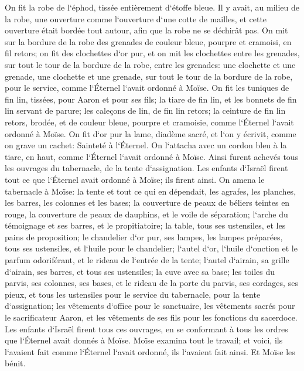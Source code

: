 \verse On fit la robe de l`éphod, tissée entièrement d`étoffe bleue. 
\verse Il y avait, au milieu de la robe, une ouverture comme l`ouverture d`une cotte de mailles, et cette ouverture était bordée tout autour, afin que la robe ne se déchirât pas. 
\verse On mit sur la bordure de la robe des grenades de couleur bleue, pourpre et cramoisi, en fil retors; 
\verse on fit des clochettes d`or pur, et on mit les clochettes entre les grenades, sur tout le tour de la bordure de la robe, entre les grenades: 
\verse une clochette et une grenade, une clochette et une grenade, sur tout le tour de la bordure de la robe, pour le service, comme l`Éternel l`avait ordonné à Moïse. 
\verse On fit les tuniques de fin lin, tissées, pour Aaron et pour ses fils; 
\verse la tiare de fin lin, et les bonnets de fin lin servant de parure; les caleçons de lin, de fin lin retors; 
\verse la ceinture de fin lin retors, brodée, et de couleur bleue, pourpre et cramoisie, comme l`Éternel l`avait ordonné à Moïse. 
\verse On fit d`or pur la lame, diadème sacré, et l`on y écrivit, comme on grave un cachet: Sainteté à l`Éternel. 
\verse On l`attacha avec un cordon bleu à la tiare, en haut, comme l`Éternel l`avait ordonné à Moïse. 
\verse Ainsi furent achevés tous les ouvrages du tabernacle, de la tente d`assignation. Les enfants d`Israël firent tout ce que l`Éternel avait ordonné à Moïse; ils firent ainsi. 
\verse On amena le tabernacle à Moïse: la tente et tout ce qui en dépendait, les agrafes, les planches, les barres, les colonnes et les bases; 
\verse la couverture de peaux de béliers teintes en rouge, la couverture de peaux de dauphins, et le voile de séparation; 
\verse l`arche du témoignage et ses barres, et le propitiatoire; 
\verse la table, tous ses ustensiles, et les pains de proposition; 
\verse le chandelier d`or pur, ses lampes, les lampes préparées, tous ses ustensiles, et l`huile pour le chandelier; 
\verse l`autel d`or, l`huile d`onction et le parfum odoriférant, et le rideau de l`entrée de la tente; 
\verse l`autel d`airain, sa grille d`airain, ses barres, et tous ses ustensiles; la cuve avec sa base; 
\verse les toiles du parvis, ses colonnes, ses bases, et le rideau de la porte du parvis, ses cordages, ses pieux, et tous les ustensiles pour le service du tabernacle, pour la tente d`assignation; 
\verse les vêtements d`office pour le sanctuaire, les vêtements sacrés pour le sacrificateur Aaron, et les vêtements de ses fils pour les fonctions du sacerdoce. 
\verse Les enfants d`Israël firent tous ces ouvrages, en se conformant à tous les ordres que l`Éternel avait donnés à Moïse. 
\verse Moïse examina tout le travail; et voici, ils l`avaient fait comme l`Éternel l`avait ordonné, ils l`avaient fait ainsi. Et Moïse les bénit. 

